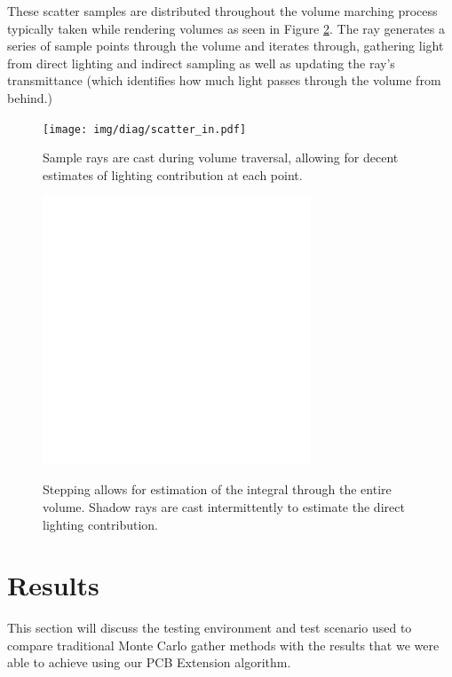 \documentclass[12pt]{ucthesis}
\newcommand{\captionfonts}{\small\bf\ssp}
\begin{document}
These scatter samples are distributed throughout the volume marching process typically taken while rendering volumes as seen in Figure \ref{fig:vol_step}.  The ray generates a series of sample points through the volume and iterates through, gathering light from direct lighting and indirect sampling as well as updating the ray's transmittance (which identifies how much light passes through the volume from behind.)


\begin{figure}[h!]
    \centering
    \texttt{[image: img/diag/scatter\_in.pdf]}
    \captionfonts
    \caption{Sample rays are cast during volume traversal, allowing for decent estimates of lighting contribution at each point.}
    \label{fig:scatter_in}
\end{figure}


\begin{figure}[h!]
    \centering
    \includegraphics[width=80mm]{img/diag/vol_step.pdf}
    \captionfonts
    \caption{Stepping allows for estimation of the integral through the entire volume.  Shadow rays are cast intermittently to estimate the direct lighting contribution. }
    \label{fig:vol_step}
\end{figure}

\chapter{Results}

This section will discuss the testing environment and test scenario used to compare traditional Monte Carlo gather methods with the results that we were able to achieve using our PCB Extension algorithm.
\end{document}
